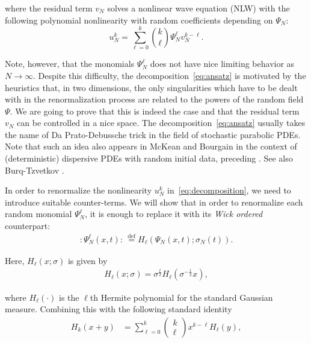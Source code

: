 \documentclass[letterpaper, 11pt,  reqno]{amsart}
\newcommand{\1}{\hspace{0.5mm}\text{I}\hspace{0.5mm}}
\newcommand{\noi}{\noindent}
\newcommand{\s}{\sigma}
\renewcommand{\l}{\ell}
\numberwithin{equation}{section}
\numberwithin{theorem}{section}
\begin{document}
\noi
where the residual term $v_N$ solves a nonlinear wave equation (NLW) with 
the following  polynomial nonlinearity 
with random coefficients depending on $\Psi_N$:
\begin{equation}
\label{eq:decomposition}
u_N^k = \sum_{\ell=0}^k {k\choose \ell} \Psi_N^\ell v_N^{k-\ell}.
\end{equation}


\noi
Note, however, that
  the monomials $\Psi_N^\ell$ does not have nice limiting behavior as $N\to \infty$. 
  Despite this difficulty,  the decomposition~\eqref{eq:ansatz} is motivated by the heuristics that, in two dimensions, the only singularities which have to be dealt with in the renormalization process are related to the powers of the random field $\Psi$. We are going to prove that this is indeed the case and that the residual term $v_N$ can be controlled in a nice space. The decomposition~\eqref{eq:ansatz} usually takes the name of Da Prato-Debussche trick \cite{DPD}
in the field of stochastic parabolic  PDEs.
Note that such an idea also appears in 
McKean \cite{McKean} and 
Bourgain \cite{BO96} in the context of (deterministic) dispersive PDEs with random initial data, preceding \cite{DPD}. See also Burq-Tzvetkov \cite{BT1}.
 
In order to renormalize the nonlinearity $u_N^k$ in~\eqref{eq:decomposition},
 we need to introduce suitable counter-terms. We will show that in order to renormalize 
 each random monomial $\Psi^\ell_N$,
  it is enough to replace it with its \emph{Wick ordered} counterpart: 
\begin{align}
:\!\Psi^\l_N(x, t) \!: \, \stackrel{\text{def}}{=} H_\ell(\Psi_N(x, t);\sigma_N(t)).
\label{Herm1}
\end{align}


\noi
Here,  
$H_\l(x; \s )$ is given by 
\begin{align*}
H_\l(x; \s )  = \s^\frac{\l}{2} H_\l(\s^{-\frac{1}{2}} x),
\end{align*}

\noi
 where $H_\l(\cdot)$ is the $\l$th Hermite polynomial for the standard Gaussian measure.
Combining this with the following standard identity
\begin{align*}
 H_k(x+y) 
& = \sum_{\l = 0}^k
\begin{pmatrix}
k \\ \l
\end{pmatrix}
x^{k - \l} H_\l(y), 
\end{align*}
\end{document}
